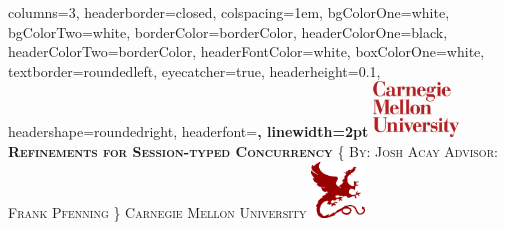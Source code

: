 \documentclass[landscape,a0paper,fontscale=0.285]{baposter} %
\theoremstyle{plain}
\begin{document}
\begin{poster}
{
columns=3,
headerborder=closed, %
colspacing=1em, %
bgColorOne=white, %
bgColorTwo=white, %
borderColor=borderColor, %
headerColorOne=black, %
headerColorTwo=borderColor, %
headerFontColor=white, %
boxColorOne=white, %
textborder=roundedleft, %
eyecatcher=true, %
headerheight=0.1\textheight, %
headershape=roundedright, %
headerfont=\Large\bf\textsc, %
linewidth=2pt %
}
%
{\includegraphics[height=4em]{cmu_logo.jpg}} %
{\bf\textsc{Refinements for Session-typed Concurrency}\vspace{0.5em}} %
{\textsc{\{ By: Josh Acay \hspace{6pt} Advisor: Frank Pfenning \} \hspace{12pt} Carnegie Mellon University}} %
{\includegraphics[height=4em]{scs_logo.png}} %



\end{poster}
\end{document}
